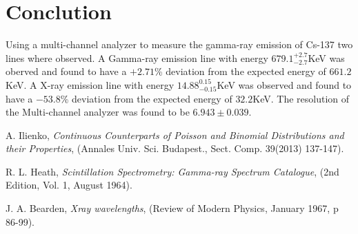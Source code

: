 \documentclass[%
 reprint,
 amsmath,amssymb,
 aps,
]{revtex4-1}
\begin{document}
\section{Conclution}
Using a multi-channel analyzer to measure the gamma-ray emission of Cs-137 two lines where observed. A Gamma-ray emission line with energy $679.1_{-2.7}^{+2.7}$KeV was oberved and found to have a $+2.71$\% deviation from the expected energy of $661.2$KeV. A X-ray emission line with energy $14.88_{-0.15}^{0.15}$KeV was observed and found to have a $-53.8$\% deviation from the expected energy of $32.2$KeV. The resolution of the Multi-channel analyzer was found to be $6.943\pm0.039$.

\begin{thebibliography}{1}

 A. Ilienko, \textit{Continuous Counterparts of Poisson and Binomial Distributions and their Properties}, (Annales Univ. Sci. Budapest., Sect. Comp. 39(2013) 137-147).

 R. L. Heath, \textit{Scintillation Spectrometry: Gamma-ray Spectrum Catalogue}, (2nd Edition, Vol. 1, August 1964).

 J. A. Bearden, \textit{Xray wavelengths}, (Review of Modern Physics, January 1967, p 86-99).

\end{thebibliography}
 
\end{document}
